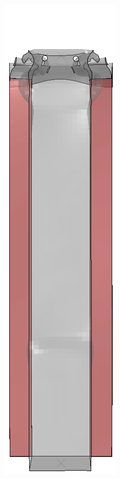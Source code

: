 \documentclass[
documentsize = a4, %
font = cmr, %
typesize = 11, %
printmode = true,
onehalfspacing = true,
language = en, %
titlepage = udciccp, %
degree = pt, %
dedication = true,
acknowledgements = true,
abstract-en = true,
abstract-es = false,
abstract-ga = false,
epigraphs = true,
toc = true,
lof = true,
lot = true,
frontmatterintoc = false,
notation = false,
minimal = false,
]{UDCthesis}
\begin{document}
\begin{figure}
\begin{minipage}[b]{.06\linewidth}
	\end{minipage}
	\quad
	\begin{minipage}[b]{.06\linewidth}
		\centering
		\includegraphics[width=\linewidth]{IMG_CUTRES/a2}

\end{minipage}
\end{figure}
\end{document}
